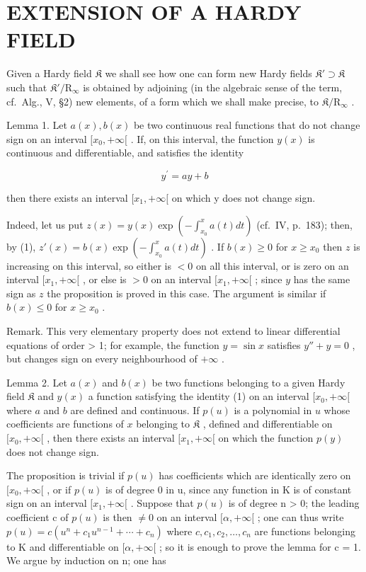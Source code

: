 \section{EXTENSION OF A HARDY FIELD}

Given a Hardy field \(\mathfrak{K}\) we shall see how one can form new Hardy fields \(\mathfrak{K}' \supset \mathfrak{K}\) such that \(\mathfrak{K}' / \mathrm{R}_{\infty}\) is obtained by adjoining (in the algebraic sense of the term, cf.~Alg., V, §2) new elements, of a form which we shall make precise, to \(\mathfrak{K} / \mathrm{R}_{\infty}\) .

Lemma 1. Let \(a(x), b(x)\) be two continuous real functions that do not change sign on an interval \([x_0, +\infty[\) . If, on this interval, the function \(y(x)\) is continuous and differentiable, and satisfies the identity

\[
y ^ {\prime} = a y + b\tag{1}
\]

then there exists an interval \([x_{1}, +\infty[\) on which y does not change sign.

Indeed, let us put \(z(x) = y(x) \exp \left(-\int_{x_0}^x a(t)dt\right)\) (cf.~IV, p.~183); then, by (1), \(z'(x) = b(x) \exp \left(-\int_{x_0}^x a(t)dt\right)\) . If \(b(x) \geqslant 0\) for \(x \geqslant x_0\) then \(z\) is increasing on this interval, so either is \(< 0\) on all this interval, or is zero on an interval \([x_1, +\infty[\) , or else is \(> 0\) on an interval \([x_1, +\infty[\) ; since \(y\) has the same sign as \(z\) the proposition is proved in this case. The argument is similar if \(b(x) \leqslant 0\) for \(x \geqslant x_0\) .

Remark. This very elementary property does not extend to linear differential equations of order \textgreater{} 1; for example, the function \(y = \sin x\) satisfies \(y'' + y = 0\) , but changes sign on every neighbourhood of \(+\infty\) .

Lemma 2. Let \(a(x)\) and \(b(x)\) be two functions belonging to a given Hardy field \(\mathfrak{K}\) and \(y(x)\) a function satisfying the identity (1) on an interval \([x_0, +\infty[\) where \(a\) and \(b\) are defined and continuous. If \(p(u)\) is a polynomial in \(u\) whose coefficients are functions of \(x\) belonging to \(\mathfrak{K}\) , defined and differentiable on \([x_0, +\infty[\) , then there exists an interval \([x_1, +\infty[\) on which the function \(p(y)\) does not change sign.

The proposition is trivial if \(p(u)\) has coefficients which are identically zero on \([x_{0}, +\infty[\) , or if \(p(u)\) is of degree 0 in u, since any function in K is of constant sign on an interval \([x_{1}, +\infty[\) . Suppose that \(p(u)\) is of degree n \textgreater{} 0; the leading coefficient c of \(p(u)\) is then \(\neq 0\) on an interval \([\alpha, +\infty[\) ; one can thus write \(p(u) = c(u^{n} + c_{1}u^{n-1} + \cdots + c_{n})\) where \(c, c_{1}, c_{2}, \ldots, c_{n}\) are functions belonging to K and differentiable on \([\alpha, +\infty[\) ; so it is enough to prove the lemma for c = 1. We argue by induction on n; one has

